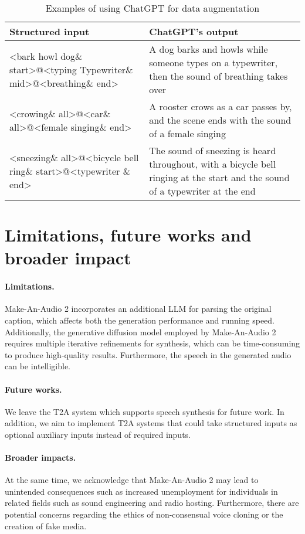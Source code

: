 \documentclass{article}
\begin{document}
\begin{table}[htbp]
  \centering
    \begin{tabular}{p{14.835em}|p{22.335em}}
    \hline
    Structured input & ChatGPT's output \\
    \hline
    <bark howl dog\& start>@<typing Typewriter\& mid>@<breathing\& end> & A dog barks and howls while someone types on a typewriter, then the sound of breathing takes over \\
    \hline
    <crowing\& all>@<car\& all>@<female singing\& end> & A rooster crows as a car passes by, and the scene ends with the sound of a female singing \\
    \hline
    <sneezing\& all>@<bicycle bell ring\& start>@<typewriter \& end> & The sound of sneezing is heard throughout, with a bicycle bell ringing at the start and the sound of a typewriter at the end \\
    \hline
    \end{tabular}\vspace{5pt}
  \caption{Examples of using ChatGPT for data augmentation}
  \label{tab:data_aug}\end{table}

\section{Limitations, future works and broader impact}  \label{app:limit}
\paragraph{Limitations.}
Make-An-Audio 2 incorporates an additional LLM for parsing the original caption, which affects both the generation performance and running speed. Additionally, the generative diffusion model employed by Make-An-Audio 2 requires multiple iterative refinements for synthesis, which can be time-consuming to produce high-quality results. Furthermore, the speech in the generated audio can be intelligible.
\paragraph{Future works.}
We leave the T2A system which supports speech synthesis for future work. In addition, we aim to implement T2A systems that could take structured inputs as optional auxiliary inputs instead of required inputs.
\paragraph{Broader impacts.}
At the same time, we acknowledge that Make-An-Audio 2 may lead to unintended consequences such as increased unemployment for individuals in related fields such as sound engineering and radio hosting. Furthermore, there are potential concerns regarding the ethics of non-consensual voice cloning or the creation of fake media.

 
\end{document}
